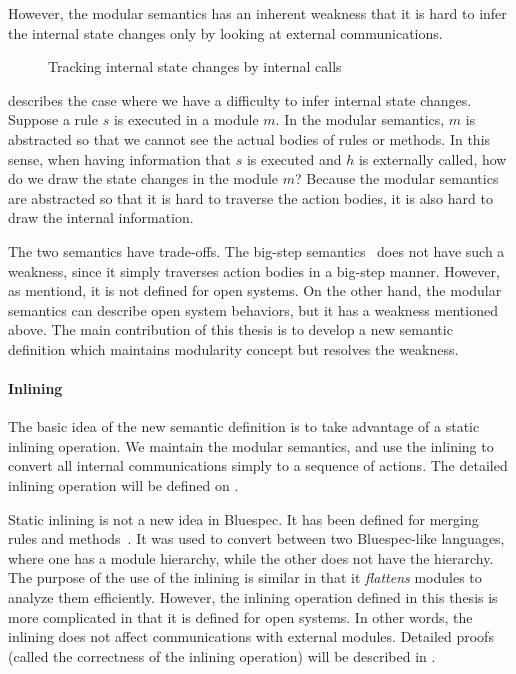 However, the modular semantics has an inherent weakness that it is
hard to infer the internal state changes only by looking at external
communications.
\begin{figure}[t]
  \caption{Tracking internal state changes by internal calls}
  \label{ex-modular-semantics-disadvantage}
\end{figure}
 describes the case where we
have a difficulty to infer internal state changes. Suppose a rule $s$
is executed in a module $m$. In the modular semantics, $m$ is
abstracted so that we cannot see the actual bodies of rules or
methods. In this sense, when having information that $s$ is executed
and $h$ is externally called, how do we draw the state changes in the
module $m$? Because the modular semantics are abstracted so that it is
hard to traverse the action bodies, it is also hard to draw the
internal information.

The two semantics have trade-offs. The big-step
semantics~\cite{nirav-memocode} does not have such a weakness, since
it simply traverses action bodies in a big-step manner. However, as
mentiond, it is not defined for open systems. On the other hand, the
modular semantics can describe open system behaviors, but it has a
weakness mentioned above. The main contribution of this thesis is to
develop a new semantic definition which maintains modularity concept
but resolves the weakness.

\paragraph{Inlining}

The basic idea of the new semantic definition is to take advantage of
a static inlining operation. We maintain the modular semantics, and
use the inlining to convert all internal communications simply to a
sequence of actions. The detailed inlining operation will be defined
on .

Static inlining is not a new idea in Bluespec. It has been defined for
merging rules and methods~\cite{daniel-thesis}. It was used to convert
between two Bluespec-like languages, where one has a module hierarchy,
while the other does not have the hierarchy. The purpose of the use of
the inlining is similar in that it \emph{flattens} modules to analyze
them efficiently. However, the inlining operation defined in this
thesis is more complicated in that it is defined for open systems. In
other words, the inlining does not affect communications with external
modules. Detailed proofs (called the correctness of the inlining
operation) will be described in .


